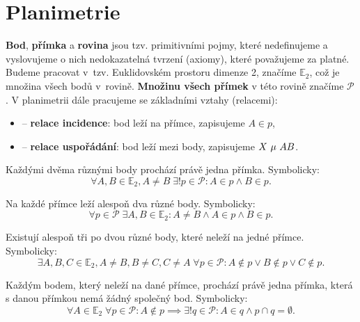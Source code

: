 \section{Planimetrie}

\begin{pozn}
  \textbf{Bod}, \textbf{přímka} a \textbf{rovina} jsou tzv. primitivními pojmy, které nedefinujeme a vyslovujeme o nich nedokazatelná tvrzení (axiomy),
  které považujeme za platné. Budeme pracovat v~tzv. Euklidovském prostoru dimenze 2, značíme $\mathbb E_2$,
  což je množina všech bodů v~rovině. \textbf{Množinu všech přímek} v této rovině značíme $\mathscr P$.
  V planimetrii dále pracujeme se základními vztahy (relacemi):
  \begin{itemize}
    \item {} -- \textbf{relace incidence}: bod leží na přímce, zapisujeme $A \in p$,
    \item {} -- \textbf{relace uspořádání}: bod leží mezi body, zapisujeme $X \operatorname{\,\mu\,} AB$.
  \end{itemize}
\end{pozn}

\begin{axiom}
  Každými dvěma různými body prochází právě jedna přímka. Symbolicky:
  $$\forall A, B \in \mathbb E_2, A\neq B\; \exists! p \in \mathscr P\colon A \in p \land B \in p.$$
\end{axiom}

\begin{axiom}
  Na každé přímce leží alespoň dva různé body. Symbolicky:
  $$\forall p \in \mathscr P\;\exists A,B \in \mathbb E_2\colon A\neq B \land A \in p \land B \in p.$$
\end{axiom}

\begin{axiom}
  Existují alespoň tři po dvou různé body, které neleží na jedné přímce. Symbolicky:
  $$\exists A,B,C \in \mathbb E_2, A \neq B, B\neq C, C\neq A\; \forall p \in \mathscr P\colon A \notin p \lor B \notin p \lor C \notin p.$$
\end{axiom}

\begin{axiom}\label{eukl_ax}
  Každým bodem, který neleží na dané přímce, prochází právě jedna přímka, která s danou přímkou nemá žádný společný bod. Symbolicky:
  $$\forall A \in \mathbb E_2\; \forall p \in \mathscr P\colon A \notin p \implies \exists! q \in \mathscr P\colon A \in q \land p \cap q = \emptyset.$$
\end{axiom}

